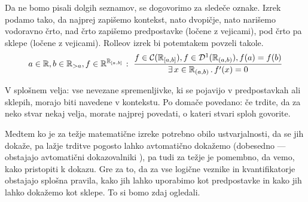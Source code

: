         Da ne bomo pisali dolgih seznamov, se dogovorimo za sledeče oznake. Izrek podamo tako, da najprej zapišemo kontekst, nato dvopičje, nato narišemo vodoravno črto, nad črto zapišemo predpostavke (ločene z vejicami), pod črto pa sklepe (ločene z vejicami). Rolleov izrek bi potemtakem povzeli takole.
        \[\claim{a \in \RR, b \in \RR_{> a}, f \in \RR^{\intcc{a}{b}}}{f \in \mathcal{C}(\intcc{a}{b}), f \in \mathcal{D}^1(\intoo{a}{b}), f(a) = f(b)}{\xsome{x}[\intoo{a}{b}]{f'(x) = 0}}\]

        V splošnem velja: vse nevezane spremenljivke, ki se pojavijo v predpostavkah ali sklepih, morajo biti navedene v kontekstu. Po domače povedano: če trdite, da za neko stvar nekaj velja, morate najprej povedati, o kateri stvari sploh govorite.

        Medtem ko je za težje matematične izreke potrebno obilo ustvarjalnosti, da se jih dokaže, pa lažje trditve pogosto lahko avtomatično dokažemo (dobesedno --- obstajajo avtomatični dokazovalniki ), pa tudi za težje je pomembno, da vemo, kako pristopiti k dokazu. Gre za to, da za vse logične veznike in kvantifikatorje obstajajo splošna pravila, kako jih lahko uporabimo kot predpostavke in kako jih lahko dokažemo kot sklepe. To si bomo zdaj ogledali.

